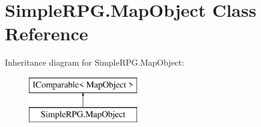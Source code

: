 \hypertarget{class_simple_r_p_g_1_1_map_object}{\section{Simple\-R\-P\-G.\-Map\-Object Class Reference}
\label{class_simple_r_p_g_1_1_map_object}
}
Inheritance diagram for Simple\-R\-P\-G.\-Map\-Object\-:\begin{figure}[H]
\begin{center}
\leavevmode
\includegraphics[height=2.000000cm]{class_simple_r_p_g_1_1_map_object}
\end{center}
\end{figure}
